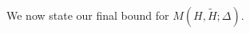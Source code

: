 \documentclass[reqno, 11pt]{amsart}
\renewcommand{\leq}{\leqslant}
\renewcommand{\geq}{\geqslant}
\theoremstyle{definition}
\theoremstyle{definition}
\renewcommand{\geq}{\geqslant}
\renewcommand{\leq}{\leqslant}
\newcommand{\uu}{\mathbf{u}}
\newcommand{\xx}{\mathbf{x}}
\newcommand{\ZZ}{\mathbb{Z}}
\newcommand{\NNN}{\mathbf{N}}
\numberwithin{equation}{section}
\begin{document}




We now state our final bound for $M(H, \tilde{H}; \Delta)$.
\end{document}
